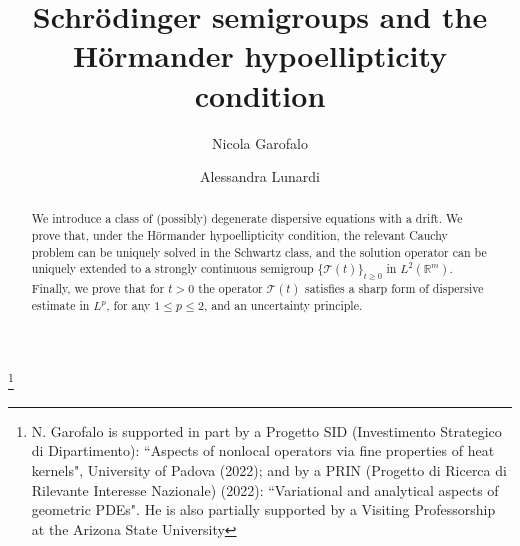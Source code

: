 \documentclass[11pt,a4paper]{amsart}
\newcommand{\Rm}{\mathbb R^m}
\numberwithin{equation}{section}
\numberwithin{equation}{section}
\begin{document}
\title[Schr\"odinger semigroups, etc.]{Schr\"odinger semigroups and the H\"ormander hypoellipticity condition} 








\date{}

\begin{abstract}
We introduce a class of (possibly) degenerate dispersive equations with a drift. We prove that, under the H\"ormander hypoellipticity condition, the relevant Cauchy problem can be uniquely solved in the Schwartz class, and the solution operator can be uniquely extended to a strongly continuous semigroup $\{\mathcal T(t)\}_{t\ge 0}$ in $L^2(\Rm)$. Finally, we prove that for $t>0$ the operator $\mathcal T(t)$ satisfies a sharp form of dispersive estimate in $L^p$, for any $1\le p\le 2$, and an uncertainty principle. 
\end{abstract}


\author{Nicola Garofalo}

\address{Dipartimento d'Ingegneria Civile e Ambientale (DICEA)\\ Universit\`a di Padova\\ Via Marzolo, 9 - 35131 Padova,  Italy}
\vskip 0.2in

\thanks{N. Garofalo is supported in part by a Progetto SID (Investimento Strategico di Dipartimento): ``Aspects of nonlocal operators via fine properties of heat kernels", University of Padova (2022); and by a PRIN (Progetto di Ricerca di Rilevante Interesse Nazionale) (2022): ``Variational and analytical aspects of geometric PDEs". He is also partially supported by a Visiting Professorship at the Arizona State University}

\author{Alessandra Lunardi}

\address{Dipartimento di Scienze Matematiche, Fisiche e Informatiche
Universit\`a di Parma\\
Parco Area delle Scienze 53/A - 43124 Parma, Italy}
\vskip 0.2in



\maketitle

\end{document}
